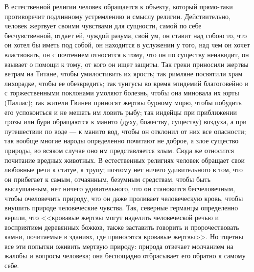 \documentclass[12pt,oneside]{book}
\begin{document}
В естественной религии человек обращается к объекту, который прямо-таки противоречит подлинному устремлению и смыслу религии. Действительно, человек жертвует своими чувствами для сущности, самой по себе бесчувственной, отдает ей, чуждой разума, свой ум, он ставит над собою то, что он хотел бы иметь под собой, он находится в услужении у того, над чем он хочет властвовать, он с почтением относится к тому, что он по существу ненавидит, он взывает о помощи к тому, от кого он ищет защиты. Так греки приносили жертвы ветрам на Титане, чтобы умилостивить их ярость; так римляне посвятили храм лихорадке, чтобы ее обезвредить; так тунгусы во время эпидемий благоговейно и с торжественными поклонами умоляют болезнь, чтобы она миновала их юрты (Паллас); так жители Гвинеи приносят жертвы бурному морю, чтобы побудить его успокоиться и не мешать им ловить рыбу; так индейцы при приближении грозы или бури обращаются к манито (духу, божеству, существу) воздуха, а при путешествии по воде --- к манито вод, чтобы он отклонил от них все опасности; так вообще многие народы определенно почитают не доброе, а злое существо природы, во всяком случае оно им представляется злым. Сюда же относится почитание вредных животных. В естественных религиях человек обращает свои любовные речи к статуе, к трупу; поэтому нет ничего удивительного в том, что он прибегает к самым, отчаянным, безумным средствам, чтобы быть выслушанным, нет ничего удивительного, что он становится бесчеловечным, чтобы очеловечить природу, что он даже проливает человеческую кровь, чтобы внушить природе человеческие чувства. Так, северные германцы определенно верили, что <<кровавые жертвы могут наделить человеческой речью и восприятием деревянных божков, также заставить говорить и пророчествовать камни, почитаемые в зданиях, где приносятся кровавые жертвы>>. Но тщетны все эти попытки оживить мертвую природу: природа отвечает молчанием на жалобы и вопросы человека; она беспощадно отбрасывает его обратно к самому себе.

\chapter{}
\end{document}
